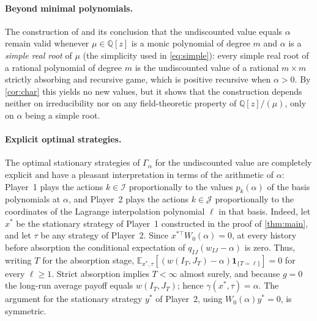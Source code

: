 \documentclass[11pt, a4paper]{article}
\theoremstyle{plain}
\theoremstyle{definition}
\newcommand{\Q}{\mathbb{Q}}
\newcommand{\E}{\mathbb{E}}
\newcommand{\I}{\mathcal{I}}
\newcommand{\J}{\mathcal{J}}
\begin{document}
\paragraph{Beyond minimal polynomials.}
The construction of  and its conclusion that the undiscounted value equals $\alpha$ remain valid whenever $\mu\in\Q[z]$ is a monic polynomial of degree $m$ and $\alpha$ is a \emph{simple real root} of $\mu$ (the simplicity used in \cref{eq:simple}): every simple real root of a rational polynomial of degree $m$ is the undiscounted value of a rational $m\times m$ strictly absorbing and recursive game, which is positive recursive when $\alpha>0$. By \cref{cor:char} this yields no new values, but it shows that the construction depends neither on irreducibility nor on any field-theoretic property of $\Q[z]/(\mu)$, only on $\alpha$ being a simple root.

\paragraph{Explicit optimal strategies.}
The optimal stationary strategies of $\Gamma_\alpha$ for the undiscounted value are completely explicit and have a pleasant interpretation in terms of the arithmetic of $\alpha$: Player~1 plays the actions $k\in\I$ proportionally to the values $p_k(\alpha)$ of the basis polynomials at $\alpha$, and Player~2 plays the actions $k\in\J$ proportionally to the coordinates of the Lagrange interpolation polynomial $\ell$ in that basis. 
Indeed, let $x^*$ be the stationary strategy of Player~1 constructed in the proof of \cref{thm:main}, and let $\tau$ be any strategy of Player~2. Since $x^{*\top}W_0(\alpha)=0$, at every history before absorption the conditional expectation of $q_{IJ}(w_{IJ}-\alpha)$ is zero. Thus, writing $T$ for the absorption stage, $\E_{x^*,\tau}[(w(I_T,J_T)-\alpha)\mathbf 1_{\{T=\ell\}}]=0$ for every $\ell\geq1$. Strict absorption implies $T<\infty$ almost surely, and because $g=0$ the long-run average payoff equals $w(I_T,J_T)$; hence $\gamma(x^*,\tau)=\alpha$. The argument for the stationary strategy $y^*$ of Player~2, using $W_0(\alpha)y^*=0$, is symmetric.







\end{document}
